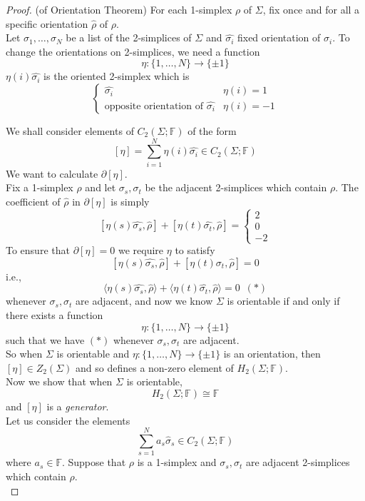 \documentclass[a4paper,14pt]{extarticle}
\theoremstyle{definition}
\begin{document}
\begin{proof}(of Orientation Theorem)
	For each 1-simplex $\rho$ of $\Sigma$, fix once and for all a specific orientation 
	$\hat{\rho}$ of $\rho$. \\

	Let $\sigma_1,\ldots,\sigma_N$ be a list of the 2-simplices of 
	$\Sigma$ and $\hat{\sigma_i}$ fixed orientation of
	$\sigma_i$. To change the orientations on 2-simplices, we need a function 
	\[\eta:\{1,\ldots,N\}\rightarrow\{\pm1\}\]
	$\eta(i)\hat{\sigma_i}$ is the oriented 2-simplex which is 
	\[\begin{cases}
		\hat{\sigma_i}&\eta(i)=1 \\ \text{opposite orientation of }\hat{\sigma_i}&\eta(i)=-1
	\end{cases}\]

We shall consider elements of $C_2(\Sigma;\mathbb{F})$ of the form 
\[[\eta]=\sum_{i=1}^N\eta(i)\hat{\sigma_i}\in C_2(\Sigma;\mathbb{F})\] We want to calculate 
$\partial[\eta]$. \\

Fix a 1-simplex $\rho$ and let $\sigma_s,\sigma_t$ be the adjacent 2-simplices which contain 
$\rho$. The coefficient of $\hat{\rho}$ in $\partial[\eta]$ is simply
\[[\eta(s)\hat{\sigma_s},\hat{\rho}]+[\eta(t)\hat{\sigma_t},\hat{\rho}]=\begin{cases}
	2\\0\\-2
\end{cases}\]
To ensure that $\partial[\eta]=0$ we require $\eta$ to satisfy 
\[[\eta(s)\hat{\sigma_s},\hat{\rho}]+[\eta(t)\hat{\sigma_t},\hat{\rho}]=0\]
i.e.,
\[\langle\eta(s)\hat{\sigma_s},\hat{\rho}\rangle+\langle\eta(t)\hat{\sigma_t},\hat{\rho}\rangle=0\,\,\,(*)\]
whenever $\sigma_s,\sigma_t$ are adjacent, and now we know
$\Sigma$ is orientable if and only if there exists a function \[\eta:\{1,\ldots,N\}
\rightarrow\{\pm1\}\] such that we have $(*)$ whenever $\sigma_s,\sigma_t$ are adjacent. \\

So when $\Sigma$ is orientable and $\eta:\{1,\ldots,N\}\rightarrow\{\pm1\}$ is an orientation,
then $[\eta]\in Z_2(\Sigma)$ and so defines a non-zero element of $H_2(\Sigma;\mathbb{F})$. \\

Now we show that when $\Sigma$ is orientable, \[H_2(\Sigma;\mathbb{F})\cong\mathbb{F}\] and
$[\eta]$ is a \emph{generator}. \\

Let us consider the elements 
\[\sum_{s=1}^N a_s\hat{\sigma}_s\in C_2(\Sigma;\mathbb{F})\] where $a_s\in\mathbb{F}$.
Suppose that $\rho$ is a 1-simplex and $\sigma_s,\sigma_t$ are adjacent 2-simplices which contain $\rho$. \\


\end{proof}
\end{document}
